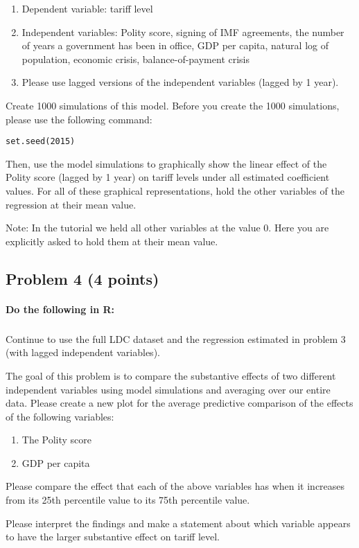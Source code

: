 \documentclass[12pt]{article}
\begin{document}
\begin{enumerate}
	\item Dependent variable: tariff level
	\item Independent variables: Polity score, signing of IMF agreements, the number of years a government has been in office, GDP per capita, natural log of population, economic crisis, balance-of-payment crisis
	\item Please use lagged versions of the independent variables (lagged by 1 year).
\end{enumerate}

\bigskip

Create 1000 simulations of this model. Before you create the 1000 simulations, please use the following command:

\begin{verbatim}
set.seed(2015)
\end{verbatim}

Then, use the model simulations to graphically show the linear effect of the Polity score (lagged by 1 year) on tariff levels under all estimated coefficient values. For all of these graphical representations, hold the other variables of the regression at their mean value.

\bigskip

Note: In the tutorial we held all other variables at the value 0. Here you are explicitly asked to hold them at their mean value.


\pagebreak

\subsection*{Problem 4 (4 points)}

\paragraph{Do the following in R:}

\subparagraph{} Continue to use the full LDC dataset and the regression estimated in problem 3 (with lagged independent variables).

The goal of this problem is to compare the substantive effects of two different independent variables using model simulations and averaging over our entire data. Please create a new plot for the average predictive comparison of the effects of the following variables:

\begin{enumerate}
	\item The Polity score
	\item GDP per capita
\end{enumerate}

Please compare the effect that each of the above variables has when it increases from its 25th percentile value to its 75th percentile value.

Please interpret the findings and make a statement about which variable appears to have the larger substantive effect on tariff level.
\end{document}
